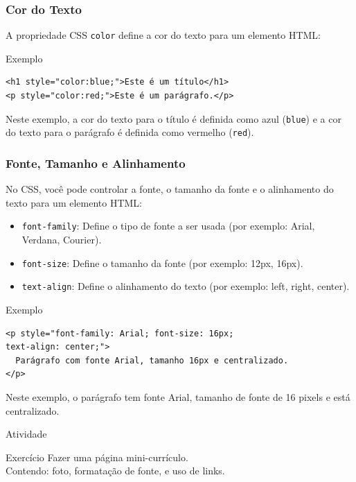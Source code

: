 \documentclass{beamer}
\begin{document}
\begin{frame}[fragile]
\frametitle{Cor do Texto}

A propriedade CSS \texttt{color} define a cor do texto para um elemento HTML:

\begin{block}{Exemplo}
\begin{verbatim}
<h1 style="color:blue;">Este é um título</h1>
<p style="color:red;">Este é um parágrafo.</p>
\end{verbatim}
\end{block}

Neste exemplo, a cor do texto para o título é definida como azul (\texttt{blue}) e a cor do texto para o parágrafo é definida como vermelho (\texttt{red}).

\end{frame}



\begin{frame}[fragile]
\frametitle{Fonte, Tamanho e Alinhamento}

No CSS, você pode controlar a fonte, o tamanho da fonte e o alinhamento do texto para um elemento HTML:

\begin{itemize}
  \item \texttt{font-family}: Define o tipo de fonte a ser usada (por exemplo: Arial, Verdana, Courier).
  \item \texttt{font-size}: Define o tamanho da fonte (por exemplo: 12px, 16px).
  \item \texttt{text-align}: Define o alinhamento do texto (por exemplo: left, right, center).
\end{itemize}

\begin{block}{Exemplo}
\begin{verbatim}
<p style="font-family: Arial; font-size: 16px; 
text-align: center;">
  Parágrafo com fonte Arial, tamanho 16px e centralizado.
</p>
\end{verbatim}
\end{block}

Neste exemplo, o parágrafo tem fonte Arial, tamanho de fonte de 16 pixels e está centralizado.

\end{frame}


\begin{frame}{Atividade}
\begin{block}{Exercício}
    Fazer uma página mini-currículo.\\
    Contendo: foto, formatação de fonte, e uso de links.
\end{block}
    
\end{frame}
\end{document}

